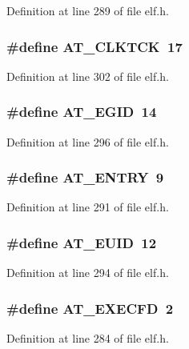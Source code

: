 Definition at line 289 of file elf.h.
\subsubsection[{AT\_\-CLKTCK}]{\setlength{\rightskip}{0pt plus 5cm}\#define AT\_\-CLKTCK~17}\label{elf_8h_4d7a26de4b48e4f0c99a48bf3cd3aa42}




Definition at line 302 of file elf.h.
\subsubsection[{AT\_\-EGID}]{\setlength{\rightskip}{0pt plus 5cm}\#define AT\_\-EGID~14}\label{elf_8h_687680c9f0b9bbabf6619f0aa5116580}




Definition at line 296 of file elf.h.
\subsubsection[{AT\_\-ENTRY}]{\setlength{\rightskip}{0pt plus 5cm}\#define AT\_\-ENTRY~9}\label{elf_8h_80f2ea99241a6afdc4718d3c4318c871}




Definition at line 291 of file elf.h.
\subsubsection[{AT\_\-EUID}]{\setlength{\rightskip}{0pt plus 5cm}\#define AT\_\-EUID~12}\label{elf_8h_22b81b71265e55a9e11e0b95d4118050}




Definition at line 294 of file elf.h.
\subsubsection[{AT\_\-EXECFD}]{\setlength{\rightskip}{0pt plus 5cm}\#define AT\_\-EXECFD~2}\label{elf_8h_8a3070773d3f9231c9390172ae3fd2e7}




Definition at line 284 of file elf.h.
